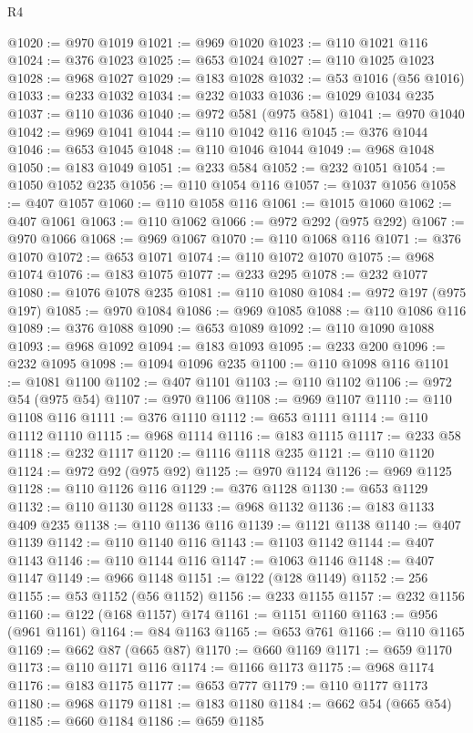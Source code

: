 \begin{lexlean}{R4}
\begin{coremodule}
@1020 := @970 @1019
@1021 := @969 @1020
@1023 := @110 @1021 @116
@1024 := @376 @1023
@1025 := @653 @1024
@1027 := @110 @1025 @1023
@1028 := @968 @1027
@1029 := @183 @1028
@1032 := @53 @1016 (@56 @1016)
@1033 := @233 @1032
@1034 := @232 @1033
@1036 := @1029 @1034 @235
@1037 := @110 @1036
@1040 := @972 @581 (@975 @581)
@1041 := @970 @1040
@1042 := @969 @1041
@1044 := @110 @1042 @116
@1045 := @376 @1044
@1046 := @653 @1045
@1048 := @110 @1046 @1044
@1049 := @968 @1048
@1050 := @183 @1049
@1051 := @233 @584
@1052 := @232 @1051
@1054 := @1050 @1052 @235
@1056 := @110 @1054 @116
@1057 := @1037 @1056
@1058 := @407 @1057
@1060 := @110 @1058 @116
@1061 := @1015 @1060
@1062 := @407 @1061
@1063 := @110 @1062
@1066 := @972 @292 (@975 @292)
@1067 := @970 @1066
@1068 := @969 @1067
@1070 := @110 @1068 @116
@1071 := @376 @1070
@1072 := @653 @1071
@1074 := @110 @1072 @1070
@1075 := @968 @1074
@1076 := @183 @1075
@1077 := @233 @295
@1078 := @232 @1077
@1080 := @1076 @1078 @235
@1081 := @110 @1080
@1084 := @972 @197 (@975 @197)
@1085 := @970 @1084
@1086 := @969 @1085
@1088 := @110 @1086 @116
@1089 := @376 @1088
@1090 := @653 @1089
@1092 := @110 @1090 @1088
@1093 := @968 @1092
@1094 := @183 @1093
@1095 := @233 @200
@1096 := @232 @1095
@1098 := @1094 @1096 @235
@1100 := @110 @1098 @116
@1101 := @1081 @1100
@1102 := @407 @1101
@1103 := @110 @1102
@1106 := @972 @54 (@975 @54)
@1107 := @970 @1106
@1108 := @969 @1107
@1110 := @110 @1108 @116
@1111 := @376 @1110
@1112 := @653 @1111
@1114 := @110 @1112 @1110
@1115 := @968 @1114
@1116 := @183 @1115
@1117 := @233 @58
@1118 := @232 @1117
@1120 := @1116 @1118 @235
@1121 := @110 @1120
@1124 := @972 @92 (@975 @92)
@1125 := @970 @1124
@1126 := @969 @1125
@1128 := @110 @1126 @116
@1129 := @376 @1128
@1130 := @653 @1129
@1132 := @110 @1130 @1128
@1133 := @968 @1132
@1136 := @183 @1133 @409 @235
@1138 := @110 @1136 @116
@1139 := @1121 @1138
@1140 := @407 @1139
@1142 := @110 @1140 @116
@1143 := @1103 @1142
@1144 := @407 @1143
@1146 := @110 @1144 @116
@1147 := @1063 @1146
@1148 := @407 @1147
@1149 := @966 @1148
@1151 := @122 (@128 @1149)
@1152 := 256
@1155 := @53 @1152 (@56 @1152)
@1156 := @233 @1155
@1157 := @232 @1156
@1160 := @122 (@168 @1157) @174
@1161 := @1151 @1160
@1163 := @956 (@961 @1161)
@1164 := @84 @1163
@1165 := @653 @761
@1166 := @110 @1165
@1169 := @662 @87 (@665 @87)
@1170 := @660 @1169
@1171 := @659 @1170
@1173 := @110 @1171 @116
@1174 := @1166 @1173
@1175 := @968 @1174
@1176 := @183 @1175
@1177 := @653 @777
@1179 := @110 @1177 @1173
@1180 := @968 @1179
@1181 := @183 @1180
@1184 := @662 @54 (@665 @54)
@1185 := @660 @1184
@1186 := @659 @1185

\end{coremodule}
\end{lexlean}
